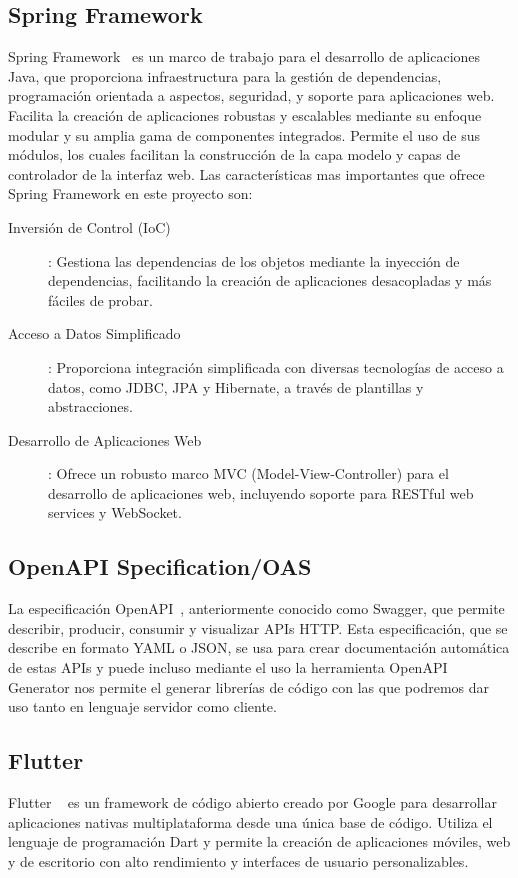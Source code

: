     \subsection{Spring Framework}
    Spring Framework~\cite{Spring} es un marco de trabajo para el desarrollo de aplicaciones Java, que proporciona infraestructura para la gestión de dependencias, 
    programación orientada a aspectos, seguridad, y soporte para aplicaciones web. Facilita la creación de aplicaciones robustas y escalables mediante su enfoque modular y su amplia gama de componentes integrados.
    Permite el uso de sus módulos, los cuales facilitan la construcción de la capa modelo y capas de controlador de la interfaz web. Las características mas importantes que ofrece Spring Framework en este proyecto son:
    \begin{description}
        \item[Inversión de Control (IoC)]: Gestiona las dependencias de los objetos mediante la inyección de dependencias, facilitando la creación de aplicaciones desacopladas y más fáciles de probar.
        \item[Acceso a Datos Simplificado]: Proporciona integración simplificada con diversas tecnologías de acceso a datos, como JDBC, JPA y Hibernate, a través de plantillas y abstracciones.
        \item[Desarrollo de Aplicaciones Web]: Ofrece un robusto marco MVC (Model-View-Controller) para el desarrollo de aplicaciones web, incluyendo soporte para RESTful web services y WebSocket.
    \end{description}
    \subsection{OpenAPI Specification/OAS}
    La especificación OpenAPI~\cite{OpenAPI}, anteriormente conocido como Swagger, que permite describir, producir, consumir y visualizar APIs HTTP.
    Esta especificación, que se describe en formato YAML o JSON, se usa para crear documentación automática de estas APIs y puede incluso mediante el uso la herramienta
    OpenAPI Generator nos permite el generar librerías de código con las que podremos dar uso tanto en lenguaje servidor como cliente.
    \subsection{Flutter}
    Flutter ~\cite{Flutter} es un framework de código abierto creado por Google para desarrollar aplicaciones nativas multiplataforma desde una única base de código. 
    Utiliza el lenguaje de programación Dart y permite la creación de aplicaciones móviles, web y de escritorio con alto rendimiento y interfaces de usuario personalizables.
